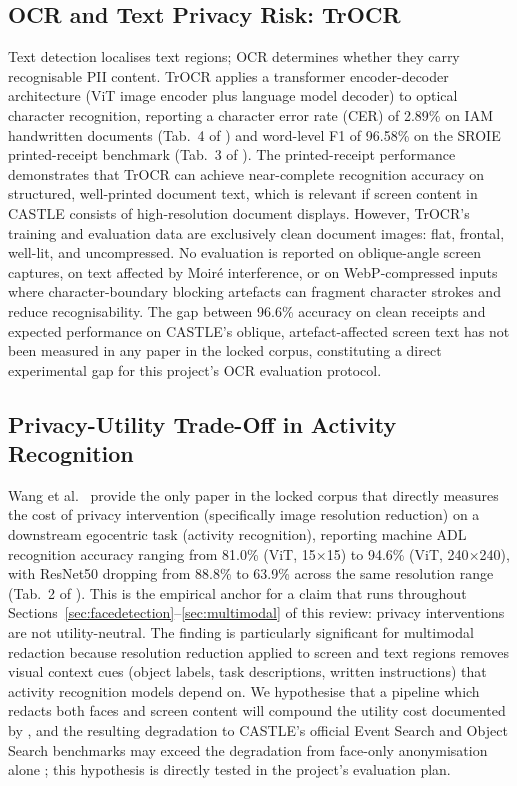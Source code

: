 \documentclass[12pt, onecolumn]{IEEEtran}
\begin{document}
\subsection{OCR and Text Privacy Risk: TrOCR}

Text detection localises text regions; OCR determines whether they
carry recognisable PII content. TrOCR \cite{li2023trocr} applies a
transformer encoder-decoder architecture (ViT image encoder plus
language model decoder) to optical character recognition, reporting
a character error rate (CER) of 2.89\% on IAM handwritten documents
(Tab.~4 of \cite{li2023trocr}) and word-level F1 of
96.58\% on the SROIE printed-receipt benchmark (Tab.~3 of
\cite{li2023trocr}). The printed-receipt performance demonstrates that
TrOCR can achieve near-complete recognition accuracy on structured,
well-printed document text, which is relevant if screen content in
CASTLE consists of high-resolution document displays. However, TrOCR's
training and evaluation data are exclusively clean document images:
flat, frontal, well-lit, and uncompressed. No evaluation is reported on
oblique-angle screen captures, on text affected by Moir{\'e}
interference, or on WebP-compressed inputs where character-boundary
blocking artefacts can fragment character strokes and reduce
recognisability. The gap between 96.6\% accuracy on clean receipts and
expected performance on CASTLE's oblique, artefact-affected screen text
has not been measured in any paper in the locked corpus, constituting a
direct experimental gap for this project's OCR evaluation protocol.

\subsection{Privacy-Utility Trade-Off in Activity Recognition}

Wang et al.\ \cite{wang2023modeling} provide the only paper in the
locked corpus that directly measures the cost of privacy intervention
(specifically image resolution reduction) on a downstream egocentric
task (activity recognition), reporting machine ADL recognition accuracy
ranging from 81.0\% (ViT, 15$\times$15) to 94.6\% (ViT, 240$\times$240),
with ResNet50 dropping from 88.8\% to 63.9\% across the same resolution
range (Tab.~2 of \cite{wang2023modeling}).
This is the empirical anchor for a claim
that runs throughout Sections~\ref{sec:facedetection}--\ref{sec:multimodal}
of this review: privacy interventions are not utility-neutral. The
finding is particularly significant for multimodal redaction because
resolution reduction applied to screen and text regions removes visual
context cues (object labels, task descriptions, written instructions)
that activity recognition models depend on. We hypothesise that a pipeline which redacts both
faces and screen content will compound the utility cost documented by
\cite{wang2023modeling}, and the resulting degradation to CASTLE's
official Event Search and Object Search benchmarks may exceed the
degradation from face-only anonymisation alone
\cite{rossetto2025castle}; this hypothesis is directly tested in the
project's evaluation plan.
\end{document}
